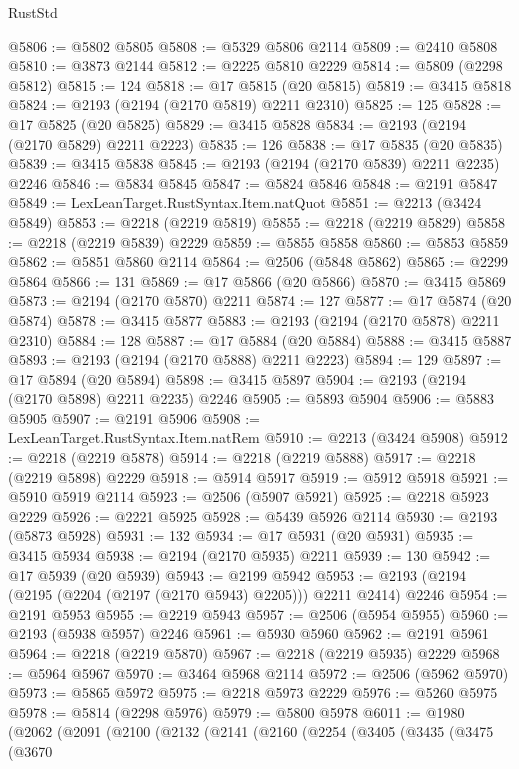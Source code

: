 \begin{lexlean}{RustStd}
\begin{coremodule}
@5806 := @5802 @5805
@5808 := @5329 @5806 @2114
@5809 := @2410 @5808
@5810 := @3873 @2144
@5812 := @2225 @5810 @2229
@5814 := @5809 (@2298 @5812)
@5815 := 124
@5818 := @17 @5815 (@20 @5815)
@5819 := @3415 @5818
@5824 := @2193 (@2194 (@2170 @5819) @2211 @2310)
@5825 := 125
@5828 := @17 @5825 (@20 @5825)
@5829 := @3415 @5828
@5834 := @2193 (@2194 (@2170 @5829) @2211 @2223)
@5835 := 126
@5838 := @17 @5835 (@20 @5835)
@5839 := @3415 @5838
@5845 := @2193 (@2194 (@2170 @5839) @2211 @2235) @2246
@5846 := @5834 @5845
@5847 := @5824 @5846
@5848 := @2191 @5847
@5849 := LexLeanTarget.RustSyntax.Item.natQuot
@5851 := @2213 (@3424 @5849)
@5853 := @2218 (@2219 @5819)
@5855 := @2218 (@2219 @5829)
@5858 := @2218 (@2219 @5839) @2229
@5859 := @5855 @5858
@5860 := @5853 @5859
@5862 := @5851 @5860 @2114
@5864 := @2506 (@5848 @5862)
@5865 := @2299 @5864
@5866 := 131
@5869 := @17 @5866 (@20 @5866)
@5870 := @3415 @5869
@5873 := @2194 (@2170 @5870) @2211
@5874 := 127
@5877 := @17 @5874 (@20 @5874)
@5878 := @3415 @5877
@5883 := @2193 (@2194 (@2170 @5878) @2211 @2310)
@5884 := 128
@5887 := @17 @5884 (@20 @5884)
@5888 := @3415 @5887
@5893 := @2193 (@2194 (@2170 @5888) @2211 @2223)
@5894 := 129
@5897 := @17 @5894 (@20 @5894)
@5898 := @3415 @5897
@5904 := @2193 (@2194 (@2170 @5898) @2211 @2235) @2246
@5905 := @5893 @5904
@5906 := @5883 @5905
@5907 := @2191 @5906
@5908 := LexLeanTarget.RustSyntax.Item.natRem
@5910 := @2213 (@3424 @5908)
@5912 := @2218 (@2219 @5878)
@5914 := @2218 (@2219 @5888)
@5917 := @2218 (@2219 @5898) @2229
@5918 := @5914 @5917
@5919 := @5912 @5918
@5921 := @5910 @5919 @2114
@5923 := @2506 (@5907 @5921)
@5925 := @2218 @5923 @2229
@5926 := @2221 @5925
@5928 := @5439 @5926 @2114
@5930 := @2193 (@5873 @5928)
@5931 := 132
@5934 := @17 @5931 (@20 @5931)
@5935 := @3415 @5934
@5938 := @2194 (@2170 @5935) @2211
@5939 := 130
@5942 := @17 @5939 (@20 @5939)
@5943 := @2199 @5942
@5953 := @2193 (@2194 (@2195 (@2204 (@2197 (@2170 @5943) @2205))) @2211 @2414) @2246
@5954 := @2191 @5953
@5955 := @2219 @5943
@5957 := @2506 (@5954 @5955)
@5960 := @2193 (@5938 @5957) @2246
@5961 := @5930 @5960
@5962 := @2191 @5961
@5964 := @2218 (@2219 @5870)
@5967 := @2218 (@2219 @5935) @2229
@5968 := @5964 @5967
@5970 := @3464 @5968 @2114
@5972 := @2506 (@5962 @5970)
@5973 := @5865 @5972
@5975 := @2218 @5973 @2229
@5976 := @5260 @5975
@5978 := @5814 (@2298 @5976)
@5979 := @5800 @5978
@6011 := @1980
    (@2062
      (@2091
        (@2100
          (@2132
            (@2141
              (@2160
                (@2254
                  (@3405
                    (@3435
                      (@3475
                        (@3670

\end{coremodule}
\end{lexlean}
